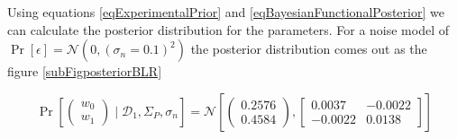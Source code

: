Using equations \ref{eqExperimentalPrior} and \ref{eqBayesianFunctionalPosterior} we can calculate the posterior distribution for the parameters. For a noise model of \(\Pr[\epsilon] = \mathcal{N}(0, (\sigma_{n}=0.1)^2)\) the posterior distribution comes out as the figure \ref{subFigposteriorBLR}

\begin{equation}\label{eqExperimentalPosterior}
\Pr \left [\begin{pmatrix}
w_{0}\\ 
w_{1}
\end{pmatrix} \mid \mathcal{D}_{1}, \Sigma_{P}, \sigma_{n} \right ] = \mathcal{N}\left [ \begin{pmatrix}
0.2576\\ 
0.4584
\end{pmatrix}, \begin{bmatrix}
0.0037 & -0.0022\\ 
-0.0022 & 0.0138
\end{bmatrix} \right ]
\end{equation}

